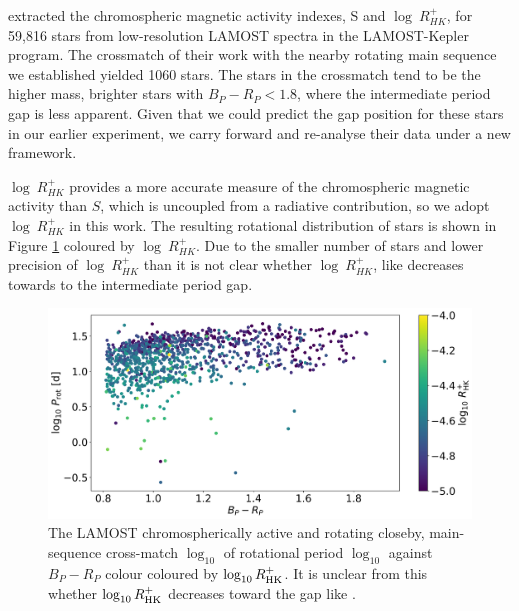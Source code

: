 \citet{zhang_magnetic_2020} extracted the chromospheric magnetic activity indexes, S and $\log \ R^{+}_{HK}$, for 59,816 stars from low-resolution LAMOST spectra in the LAMOST-Kepler program.
The crossmatch of their work with the nearby rotating main sequence we established yielded 1060 stars.
The stars in the crossmatch tend to be the higher mass, brighter stars with $B_P-R_P<1.8$, where the intermediate period gap is less apparent.
Given that we could predict the gap position for these stars in our earlier experiment, we carry forward and re-analyse their data under a new framework.

$\log \ R^{+}_{HK}$ provides a more accurate measure of the chromospheric magnetic activity than $S$, which is uncoupled from a radiative contribution, so we adopt $\log \ R^{+}_{HK}$ in this work.
The resulting rotational distribution of stars is shown in Figure \ref{fig:rot_dist_rhk} coloured by $\log \ R^{+}_{HK}$.
Due to the smaller number of stars and lower precision of $\log \ R^{+}_{HK}$ than \rper{} it is not clear whether $\log \ R^{+}_{HK}$, like \rper{} decreases towards to the intermediate period gap.


\begin{figure}
\centering
  \includegraphics[width=\textwidth]{Figures/rot_gap_figures/rotational_dist_rhk.png}
  \caption{
  The LAMOST chromospherically active and \kepler{} rotating closeby, main-sequence cross-match $\log_{10}$ of rotational period $\log_{10}$ against \gaia $B_P-R_P$ colour coloured by $\log_{10}R^{+}_{\rm{HK}}$. It is unclear from this whether $\log_{10}R^{+}_{\rm{HK}}$ decreases toward the gap like \rper{}.}
  \label{fig:rot_dist_rhk}
\end{figure}

